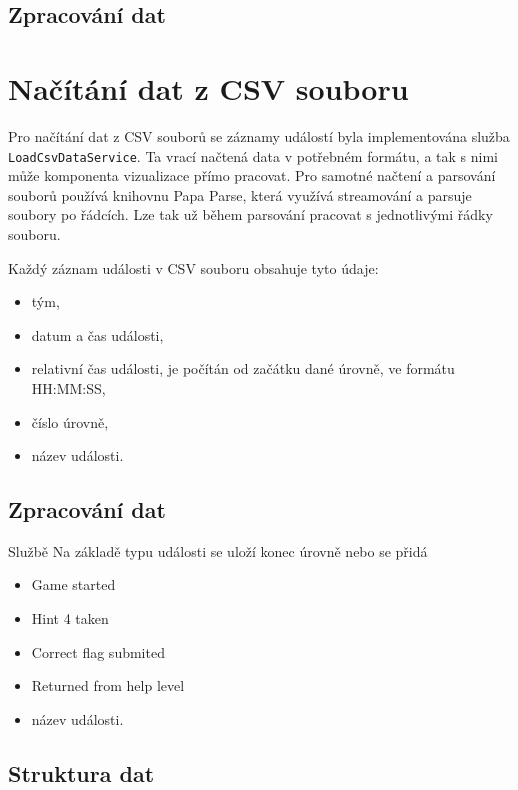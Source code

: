 \documentclass[
  digital, %
  oneside, %
  table,   %
  nolof,     %
  nolot,     %
]{fithesis3}
\begin{document}
\subsection{Zpracování dat}

\section{Načítání dat z CSV souboru}
Pro načítání dat z CSV souborů se záznamy událostí byla implementována služba \verb|LoadCsvDataService|. Ta vrací načtená data v potřebném formátu, a tak s nimi může komponenta vizualizace přímo pracovat. Pro samotné načtení a parsování souborů používá knihovnu Papa Parse, která využívá streamování a parsuje soubory po řádcích. Lze tak už během parsování pracovat s jednotlivými řádky souboru.\par
Každý záznam události v CSV souboru obsahuje tyto údaje:
\begin{itemize}
  \item tým, 
  \item datum a čas události,
  \item relativní čas události, je počítán od začátku dané úrovně, ve formátu HH:MM:SS,
  \item číslo úrovně,
  \item název události.
\end{itemize}


\subsection{Zpracování dat}
Službě 
Na základě typu události se uloží konec úrovně nebo se přidá
\begin{itemize}
  \item Game started
  \item Hint 4 taken
  \item Correct flag submited
  \item Returned from help level
  \item název události.
\end{itemize}

\subsection{Struktura dat}
\end{document}
